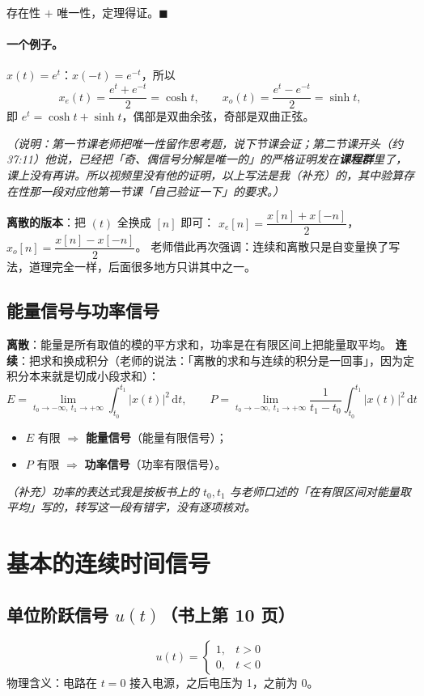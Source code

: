 \documentclass[UTF8,a4paper,11pt]{ctexart}
\renewcommand{\d}{\,\mathrm{d}}
\begin{document}
存在性 $+$ 唯一性，定理得证。$\blacksquare$

\paragraph{一个例子。}$x(t)=e^{t}$：$x(-t)=e^{-t}$，所以
\[
x_e(t)=\frac{e^{t}+e^{-t}}{2}=\cosh t,\qquad x_o(t)=\frac{e^{t}-e^{-t}}{2}=\sinh t,
\]
即 $e^t=\cosh t+\sinh t$，偶部是双曲余弦，奇部是双曲正弦。

\emph{（说明：第一节课老师把唯一性留作思考题，说下节课会证；第二节课开头（约 37:11）他说，已经把「奇、偶信号分解是唯一的」的严格证明发在\textbf{课程群}里了，课上没有再讲。所以视频里没有他的证明，以上写法是我（补充）的，其中验算存在性那一段对应他第一节课「自己验证一下」的要求。）}

\textbf{离散的版本}：把 $(t)$ 全换成 $[n]$ 即可：
$x_e[n]=\dfrac{x[n]+x[-n]}{2}$，$x_o[n]=\dfrac{x[n]-x[-n]}{2}$。
老师借此再次强调：连续和离散只是自变量换了写法，道理完全一样，后面很多地方只讲其中之一。

\subsection{能量信号与功率信号}
\textbf{离散}：能量是所有取值的模的平方求和，功率是在有限区间上把能量取平均。
\textbf{连续}：把求和换成积分（老师的说法：「离散的求和与连续的积分是一回事」，因为定积分本来就是切成小段求和）：
\[
E=\lim_{t_0\to-\infty,\ t_1\to+\infty}\int_{t_0}^{t_1}|x(t)|^2\d t,\qquad
P=\lim_{t_0\to-\infty,\ t_1\to+\infty}\frac{1}{t_1-t_0}\int_{t_0}^{t_1}|x(t)|^2\d t
\]
\begin{itemize}[nosep]
\item $E$ 有限 $\Rightarrow$ \textbf{能量信号}（能量有限信号）；
\item $P$ 有限 $\Rightarrow$ \textbf{功率信号}（功率有限信号）。
\end{itemize}
\emph{（补充）功率的表达式我是按板书上的 $t_0,t_1$ 与老师口述的「在有限区间对能量取平均」写的，转写这一段有错字，没有逐项核对。}

\section{基本的连续时间信号}

\subsection{单位阶跃信号 $u(t)$（书上第 10 页）}
\[
u(t)=\begin{cases}1,&t>0\\0,&t<0\end{cases}
\]
物理含义：电路在 $t=0$ 接入电源，之后电压为 1，之前为 0。
\end{document}
